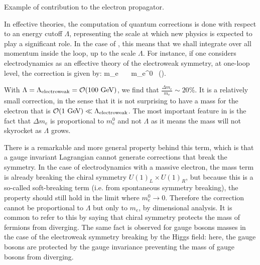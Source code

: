                  {Example of contribution to the electron propagator.}

    In effective theories, the computation of quantum corrections is done with respect to
    an energy cutoff $\Lambda$, representing the scale at which new physics is expected
    to play a significant role. In the case of ,
    this means that we shall integrate over all momentum inside the loop, up to the scale $\Lambda$.
    For instance, if one considers electrodynamics as an effective theory of the electroweak
    symmetry, at one-loop level, the correction is given by:
    {
        \Delta m_e \, \simeq \, \frac{\alpha}{4\pi} \, m_e^0 \, \left(\right).
    }

    With $\Lambda = \Lambda_{\text{electroweak}} = \mathcal{O}(100~\text{GeV})$, we find that
    $\frac{\Delta m_e}{m_e} \sim 20\%$. It is a relatively small correction, in the sense
    that it is not surprising to have a mass for the electron that is $\mathcal{O}(1~\text{GeV}) \ll \Lambda_{\text{electroweak}}$.
    The most important feature in  is the fact that $\Delta m_e$
    is proportional to $m_e^0$ and not $\Lambda$ as it means the mass will not skyrocket
    as $\Lambda$ grows.

    There is a remarkable and more general property behind this term, which is that a
    gauge invariant Lagrangian cannot generate corrections that break the symmetry. In
    the case of electrodynamics with a massive electron, the mass term is already breaking
    the chiral symmetry $U(1)_L \times U(1)_R$, but because this is a so-called soft-breaking
    term (i.e. from spontaneous symmetry breaking), the property should still hold in
    the limit where $m_e^0 \rightarrow 0$. Therefore the correction cannot be proportional to
    $\Lambda$ but only to $m_e$, by dimensional analysis. It is common to refer to this by
    saying that chiral symmetry protects the mass of fermions from diverging. The same fact
    is observed for gauge bosons masses in the case of the electroweak symmetry breaking by
    the Higgs field: here, the gauge bosons are protected by the gauge invariance preventing
    the mass of gauge bosons from diverging.

